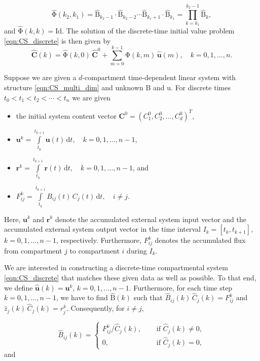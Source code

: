 \documentclass[11pt,a4paper]{article}
\renewcommand{\vec}[1]{\mathbf{#1}}
\newcommand{\tens}[1]{\mathrm{#1}}
\newcommand{\id}{\tens{Id}}
\newcommand{\dd}[1]{\,\mathrm{d}#1}
\newcommand{\intl}{\int\limits}
\newcommand{\suml}{\sum\limits}
\begin{document}
    \begin{equation*}
        \widehat{\tens{\Phi}}(k_2,k_1) = \widehat{\tens{B}}_{k_2-1}\cdot\widehat{\tens{B}}_{k_2-2}\cdots\widehat{\tens{B}}_{k_1+1}\cdot\widehat{\tens{B}}_{k_1} = \prod\limits_{k=k_1}^{k_2-1}\widehat{\tens{B}}_k,
    \end{equation*}
    and $\widehat{\tens{\Phi}}(k,k)=\id$.
    The solution of the discrete-time initial value problem \eqref{eqn:CS_discrete} is then given by
    \begin{equation*}
        \widehat{\vec{C}}(k) = \widehat{\tens{\Phi}}(k,0)\,\widehat{\vec{C}}^0 + \suml_{m=0}^{k-1} \widehat{\tens{\Phi}}(k,m)\,\widehat{\vec{u}}(m),\quad k=0,1,\ldots,n.
    \end{equation*}
    
    Suppose we are given a $d$-compartment time-dependent linear system with structure \eqref{eqn:CS_multi_dim} and unknown $\tens{B}$ and $\tens{u}$.
    For discrete times $t_0<t_1<t_2<\cdots<t_n$ we are given
    \begin{itemize}
        \item the initial system content vector $\vec{C}^0=(C^0_1,C^0_2,\ldots,C^0_d)^T$,
        \item $\vec{u}^k = \intl_{t_k}^{t_{k+1}} \vec{u}(t)\dd{t},\quad k=0,1,\ldots,n-1$, 
        \item $\vec{r}^k = \intl_{t_k}^{t_{k+1}} \vec{r}(t)\dd{t},\quad k=0,1,\ldots,n-1$, and
        \item $F_{ij}^k = \intl_{t_k}^{t_{k+1}} B_{ij}(t)\,C_j(t)\dd{t},\quad i\neq j$.
    \end{itemize}
    Here, $\vec{u}^k$ and $\vec{r}^k$ denote the accumulated external system input vector and the accumulated external system output vector in the time interval $I_k=[t_k,t_{k+1}]$, $k=0,1,\ldots,n-1$, respectively.
    Furthermore, $F^k_{ij}$ denotes the accumulated flux from compartment $j$ to compartment $i$ during $I_k$.

    We are interested in constructing a discrete-time compartmental system \eqref{eqn:CS_discrete} that matches these given data as well as possible.
    To that end, we define $\widehat{\vec{u}}(k)=\vec{u}^k$, $k=0,1,\ldots,n-1$.
    Furthermore, for each time step $k=0,1,\ldots,n-1$, we have to find $\widehat{\tens{B}}(k)$ such that $\widehat{B}_{ij}(k)\,\widehat{C}_j(k)=F^k_{ij}$ and $\widehat{z}_j(k)\,\widehat{C}_j(k)=r^k_j$.
    Consequently, for $i\neq j$,
    
    \begin{equation*}
        \widehat{B}_{ij}(k) =
        \begin{cases}
            F^k_{ij} / \widehat{C}_j(k),\quad&\text{ if }\widehat{C}_j(k)\neq0,\\
            0, &\text{ if }\widehat{C}_j(k)=0,
        \end{cases}
    \end{equation*}
    and
    
\end{document}
